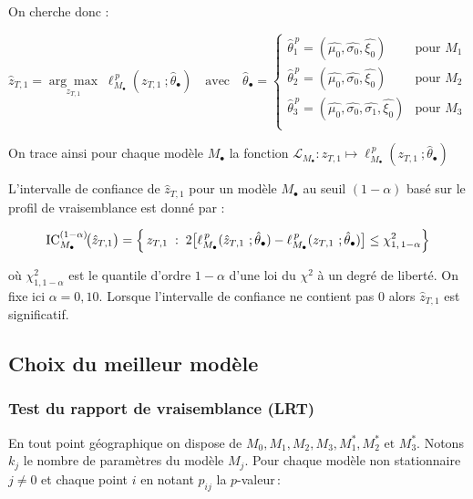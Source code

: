 \documentclass[
  article,
  nofooter,
  noheadings]{jss}
\begin{document}
On cherche donc :

\[
\hat{z}_{T,1} = \underset{z_{T,1}}{\arg\max} \; \ell_{M_\bullet}^{\,p}(z_{T,1} \ ; \hat{\theta}_{\bullet}) \quad \text{avec} \quad
\hat{\theta}_{\bullet} = \begin{cases}
\hat{\theta}_{1}^{\,p} = (\hat{\mu_0}, \hat{\sigma_0}, \hat{\xi_0}) & \text{pour } M_1 \\
\hat{\theta}_2^{\,p} = (\hat{\mu_0}, \hat{\sigma_0}, \hat{\xi_0}) & \text{pour } M_2 \\
\hat{\theta}_3^{\,p} = (\hat{\mu_0}, \hat{\sigma_0}, \hat{\sigma_1}, \hat{\xi_0}) & \text{pour } M_3 \\
\end{cases}
\]

On trace ainsi pour chaque modèle \(M_\bullet\) la fonction
\({\displaystyle \mathcal{L}_{M_\bullet} : z_{T,1} {\mapsto} \ell_{M_\bullet}^{\,p}(z_{T,1} \ ; \hat{\theta}_{\bullet})}\)

L'intervalle de confiance de \(\hat{z}_{T,1}\) pour un modèle
\(M_\bullet\) au seuil \((1 - \alpha)\) basé sur le profil de
vraisemblance est donné par :

\[
\operatorname{IC}_{M_\bullet}^{(1-\alpha)}\!\bigl(\hat{z}_{T,1}\bigr)
   = \Bigl\{\, z_{T,1}\;:\;
        2\bigl[\ell_{M_\bullet}^{\,p}(\hat{z}_{T,1} \ ; \hat{\theta}_{\bullet})-\ell_{M_\bullet}^{\,p}(z_{T,1} \ ; \hat{\theta}_{\bullet})\bigr]
        \le \chi^{2}_{1,\,1-\alpha} \Bigr\}
\]

où \(\chi^2_{1,1-\alpha}\) est le quantile d'ordre \(1 - \alpha\) d'une
loi du \(\chi^2\) à un degré de liberté. On fixe ici \(\alpha=0{,}10\).
Lorsque l'intervalle de confiance ne contient pas 0 alors
\(\hat{z}_{T,1}\) est significatif.

\subsection{Choix du meilleur modèle}\label{choix-du-meilleur-moduxe8le}

\subsubsection{Test du rapport de vraisemblance
(LRT)}\label{test-du-rapport-de-vraisemblance-lrt}

En tout point géographique on dispose de
\(M_0, M_1, M_2, M_3, M_1^\ast, M_2^\ast \text{ et } M_3^\ast\). Notons
\(k_j\) le nombre de paramètres du modèle \(M_j\). Pour chaque modèle
non stationnaire \(j\neq 0\) et chaque point \(i\) en notant \(p_{ij}\)
la \(p\)-valeur\,:
\end{document}
